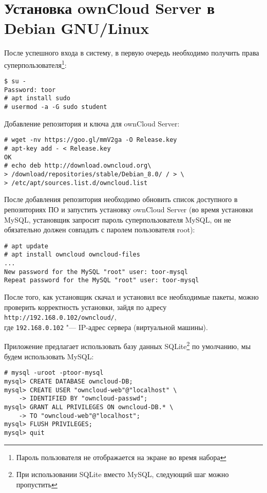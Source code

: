 \section{Установка ownCloud Server в Debian GNU/Linux} \label{pril:c}

После успешного входа в систему, в первую очередь необходимо получить права суперпользователя\footnote{Пароль пользователя не отображается на экране во время набора}:
\begin{lstlisting}
$ su -
Password: toor
# apt install sudo
# usermod -a -G sudo student
\end{lstlisting}

Добавление репозитория и ключа для ownCloud Server:
\begin{lstlisting}
# wget -nv https://goo.gl/mmV2ga -O Release.key
# apt-key add - < Release.key
OK
# echo deb http://download.owncloud.org\
> /download/repositories/stable/Debian_8.0/ / > \
> /etc/apt/sources.list.d/owncloud.list
\end{lstlisting}

После добавления репозитория необходимо обновить список доступного в репозиториях ПО и запустить установку ownCloud Server (во время установки MySQL, установщик запросит пароль суперпользователя MySQL, он не обязательно должен совпадать с паролем пользователя root):
\begin{lstlisting}
# apt update
# apt install owncloud owncloud-files
...
New password for the MySQL "root" user: toor-mysql
Repeat password for the MySQL "root" user: toor-mysql
\end{lstlisting}

После того, как установщик скачал и установил все необходимые пакеты, можно проверить корректность установки, зайдя по адресу \texttt{http://192.168.0.102/owncloud/}, \\
где \texttt{192.168.0.102} "--- IP-адрес сервера (виртуальной машины).

Приложение предлагает использовать базу данных SQLite\footnote{При использовании SQLite вместо MySQL, следующий шаг можно пропустить} по умолчанию, мы будем использовать MySQL:
\begin{lstlisting}
# mysql -uroot -ptoor-mysql
mysql> CREATE DATABASE owncloud-DB;
mysql> CREATE USER "owncloud-web"@"localhost" \
    -> IDENTIFIED BY "owncloud-passwd";
mysql> GRANT ALL PRIVILEGES ON owncloud-DB.* \
    -> TO "owncloud-web"@"localhost";
mysql> FLUSH PRIVILEGES;
mysql> quit
\end{lstlisting}


